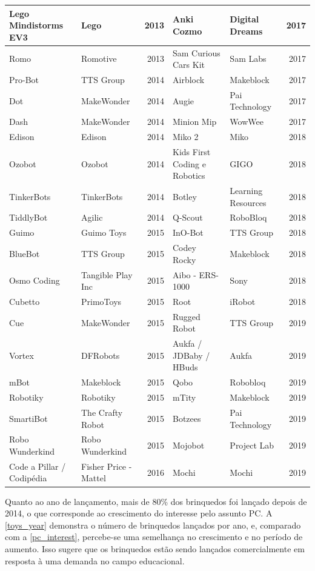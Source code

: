 {\begin{landscape}
\begin{small}
\begin{longtable}{|p{4.5cm} p{4.5cm} r| p{4.5cm} p{4.5cm} r|}
    Lego Mindistorms EV3 & Lego & 2013 &
    Anki Cozmo & Digital Dreams & 2017 \\ \hline
    Romo & Romotive & 2013 &
    Sam Curious Cars Kit & Sam Labs & 2017 \\ \hline
    Pro-Bot & TTS Group & 2014 &
    Airblock & Makeblock & 2017 \\ \hline
    Dot & MakeWonder & 2014 &
    Augie & Pai Technology & 2017 \\ \hline
    Dash & MakeWonder & 2014 &
    Minion Mip & WowWee & 2017 \\ \hline
    Edison & Edison & 2014 &
    Miko 2 & Miko & 2018 \\ \hline
    Ozobot & Ozobot & 2014 &
    Kids First Coding e Robotics & GIGO & 2018 \\ \hline
    TinkerBots & TinkerBots & 2014 &
    Botley & Learning Resources & 2018 \\ \hline
    TiddlyBot & Agilic & 2014 &
    Q-Scout & RoboBloq & 2018 \\ \hline
    Guimo & Guimo Toys & 2015 &
    InO-Bot & TTS Group & 2018 \\ \hline
    BlueBot & TTS Group & 2015 &
    Codey Rocky & Makeblock & 2018 \\ \hline
    Osmo Coding & Tangible Play Inc & 2015 &
    Aibo - ERS-1000 & Sony & 2018 \\ \hline
    Cubetto & PrimoToys & 2015 &
    Root & iRobot & 2018 \\ \hline
    Cue & MakeWonder & 2015 &
    Rugged Robot & TTS Group & 2019 \\ \hline
    Vortex & DFRobots & 2015 &
    Aukfa / JDBaby / HBuds & Aukfa & 2019 \\ \hline
    mBot & Makeblock & 2015 &
    Qobo & Robobloq & 2019 \\ \hline
    Robotiky & Robotiky & 2015 &
    mTity & Makeblock & 2019 \\ \hline
    SmartiBot & The Crafty Robot & 2015 &
    Botzees & Pai Technology & 2019 \\ \hline
    Robo Wunderkind & Robo Wunderkind & 2015 &
    Mojobot & Project Lab & 2019 \\ \hline
    Code a Pillar / Codipédia & Fisher Price - Mattel & 2016 &
    Mochi & Mochi & 2019 \\ \hline
\end{longtable}
\end{small}
\end{landscape}

Quanto ao ano de lançamento, mais de 80\% dos brinquedos foi lançado depois de 2014, o que corresponde ao crescimento do interesse pelo assunto \acl{PC}. A \autoref{toys_year} demonstra o número de brinquedos lançados por ano, e, comparado com a \autoref{pc_interest}, percebe-se uma semelhança no crescimento e no período de aumento. Isso sugere que os brinquedos estão sendo lançados comercialmente em resposta à uma demanda no campo educacional.

}
